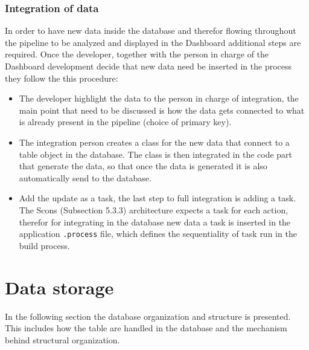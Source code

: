 \documentclass[../main.tex]{subfiles}
\begin{document}
\subsubsection{Integration of data}
In order to have new data inside the database and therefor flowing throughout the pipeline to be analyzed and displayed in the Dashboard additional steps are required. Once the developer, together with the person in charge of the Dashboard development decide that new data need be inserted in the process they follow the this procedure:
\begin{itemize}
    \item The developer highlight the data to the person in charge of integration, the main point that need to be discussed is how the data gets connected to what is already present in the pipeline (choice of primary key).
    \item The integration person creates a class for the new data that connect to a table object in the database. The class is then integrated in the code part that generate the data, so that once the data is generated it is also automatically send to the database.
    \item Add the update as a task, the last step to full integration is adding a task. The Scons (Subsection 5.3.3) architecture expects a task for each action, therefor for integrating in the database new data a task is inserted in the application \texttt{.process} file, which defines the sequentiality of task run in the build process. 
\end{itemize}
\section{Data storage}
In the following section the database organization and structure is presented. This includes how the table are handled in the database and the mechanism behind structural organization.
\end{document}
